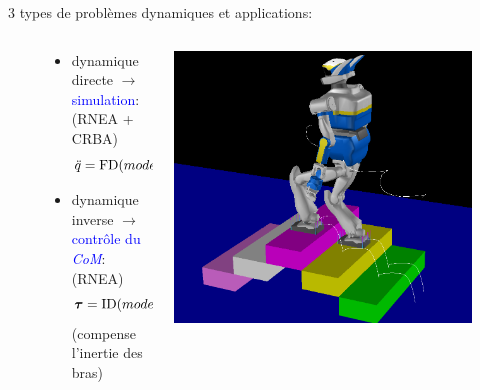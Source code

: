 \documentclass[10pt]{beamer}
\begin{document}
\begin{frame}[allowframebreaks]
	3 types de problèmes dynamiques et applications: \hfill \hyperlink{app_filDyn}{}
	\begin{figure}[T]
	\begin{columns}[T]
	  \begin{column}{.68\textwidth}
		  \begin{itemize}
		  	\item dynamique directe $\rightarrow$ \textcolor{blue}{simulation}: \\
		  	      (RNEA + CRBA)
						\begin{equation}
						\ddot{q} = \mathrm{FD}(model,\boldsymbol{q,\dot{q},\tau})
						\end{equation}
		  \item 	dynamique inverse $\rightarrow$ \textcolor{blue}{contrôle du \emph{CoM}}:
		        (RNEA)
						\begin{equation}
						\boldsymbol{\tau} = \mathrm{ID}(model,\boldsymbol{q,\dot{q},\ddot{q}})
						\end{equation}
						(compense l'inertie des bras)
			\end{itemize}
		\end{column}
		\begin{column}{.3\textwidth}
		  \begin{center}
		  \includegraphics[width=.9\textwidth]{figs/HRP2_stairs2} \\

\end{center}
\end{column}
\end{columns}
\end{figure}
\end{frame}
\end{document}
